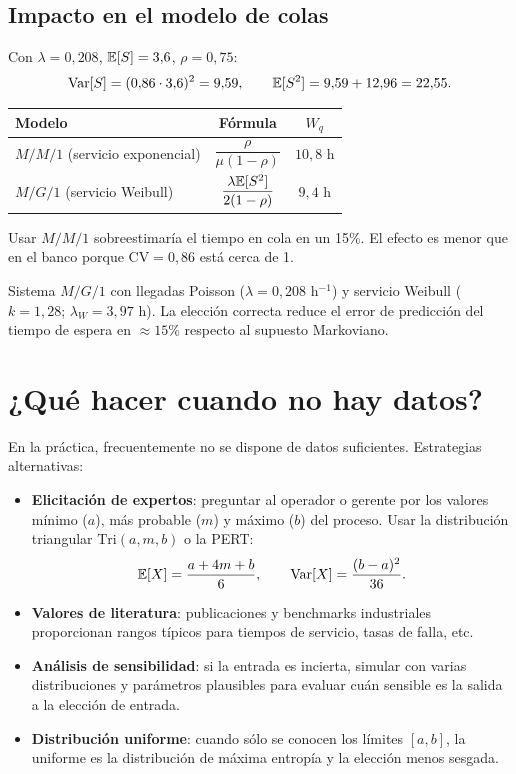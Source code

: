 \documentclass[11pt, letterpaper]{article}
\begin{document}
\subsection{Impacto en el modelo de colas}

Con $\lambda=0{,}208$, $\mathbb{E}[S]=3{,}6$, $\rho=0{,}75$:
\[
\operatorname{Var}[S] = (0{,}86 \cdot 3{,}6)^2 = 9{,}59, \qquad \mathbb{E}[S^2] = 9{,}59 + 12{,}96 = 22{,}55.
\]

\begin{center}\small
\renewcommand{\arraystretch}{1.3}
\begin{tabular}{lcc}
\toprule
\textbf{Modelo} & \textbf{Fórmula} & $W_q$ \\
\midrule
$M/M/1$ (servicio exponencial) & $\dfrac{\rho}{\mu(1-\rho)}$ & $10{,}8$ h \\[10pt]
$M/G/1$ (servicio Weibull)     & $\dfrac{\lambda\mathbb{E}[S^2]}{2(1-\rho)}$ & $9{,}4$ h \\
\bottomrule
\end{tabular}
\end{center}

Usar $M/M/1$ sobreestimaría el tiempo en cola en un 15\%. El efecto es menor que en el banco porque $\text{CV}=0{,}86$ está cerca de 1.

\begin{resultadobox}
Sistema $M/G/1$ con llegadas Poisson ($\lambda=0{,}208$ h$^{-1}$) y servicio Weibull ($k=1{,}28$; $\lambda_W=3{,}97$ h). La elección correcta reduce el error de predicción del tiempo de espera en $\approx 15\%$ respecto al supuesto Markoviano.
\end{resultadobox}

\section{¿Qué hacer cuando no hay datos?}

En la práctica, frecuentemente no se dispone de datos suficientes. Estrategias alternativas:

\begin{itemize}
    \item \textbf{Elicitación de expertos}: preguntar al operador o gerente por los valores mínimo ($a$), más probable ($m$) y máximo ($b$) del proceso. Usar la distribución triangular $\text{Tri}(a,m,b)$ o la PERT:
    \[
    \mathbb{E}[X] = \frac{a + 4m + b}{6}, \qquad \operatorname{Var}[X] = \frac{(b-a)^2}{36}.
    \]
    \item \textbf{Valores de literatura}: publicaciones y benchmarks industriales proporcionan rangos típicos para tiempos de servicio, tasas de falla, etc.
    \item \textbf{Análisis de sensibilidad}: si la entrada es incierta, simular con varias distribuciones y parámetros plausibles para evaluar cuán sensible es la salida a la elección de entrada.
    \item \textbf{Distribución uniforme}: cuando sólo se conocen los límites $[a,b]$, la uniforme es la distribución de máxima entropía y la elección menos sesgada.
\end{itemize}
\end{document}
